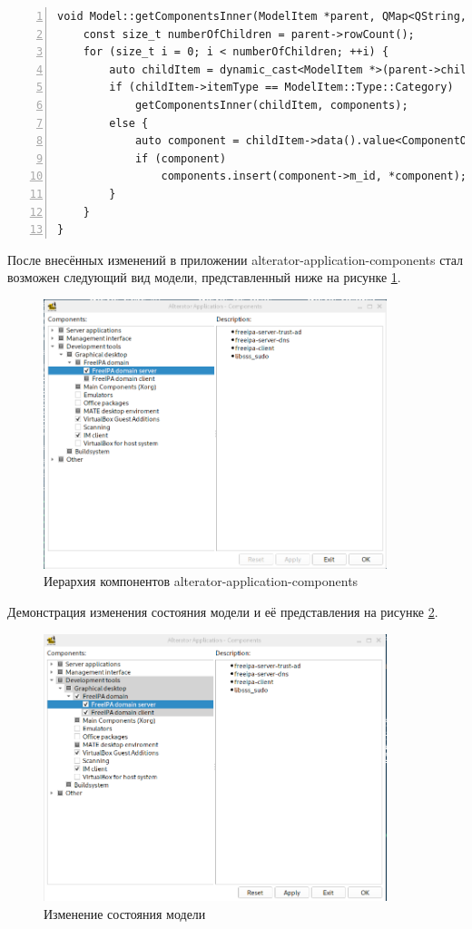 \documentclass[bachelor, och, pract]{SCWorks}
\begin{document}
\begin{Verbatim}[fontsize=\small,breaklines=true,numbers=left]
void Model::getComponentsInner(ModelItem *parent, QMap<QString, ComponentObject> &components) {
    const size_t numberOfChildren = parent->rowCount();
    for (size_t i = 0; i < numberOfChildren; ++i) {
        auto childItem = dynamic_cast<ModelItem *>(parent->child(i));
        if (childItem->itemType == ModelItem::Type::Category)
            getComponentsInner(childItem, components);
        else {
            auto component = childItem->data().value<ComponentObject *>();
            if (component)
                components.insert(component->m_id, *component);
        }
    }
}
\end{Verbatim}

После внесённых изменений в приложении alterator-application-components стал возможен следующий вид модели, представленный ниже на рисунке \ref{fig_1}.

\begin{figure}[!ht]
	\centering
	\includegraphics[width=10cm]{ierarchy.png}
	\caption{\label{fig_1}%
	Иерархия компонентов alterator-application-components}
\end{figure}

Демонстрация изменения состояния модели и её представления на рисунке \ref{fig_2}.

\begin{figure}[!ht]
	\centering
	\includegraphics[width=10cm]{ierarchy-changed.png}
	\caption{\label{fig_2}%
	Изменение состояния модели}
\end{figure}
\end{document}
